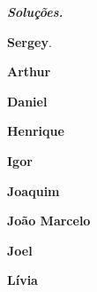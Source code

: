 \bigskip
\emph{\textbf{Soluções.}}

\smallskip
\textbf{Sergey}.


\medskip
\textbf{Arthur}


\medskip
\textbf{Daniel}


\medskip
\textbf{Henrique}


\medskip
\textbf{Igor}


\medskip
\textbf{Joaquim}


\medskip
\textbf{João Marcelo}


\medskip
\textbf{Joel}


\medskip
\textbf{Lívia}


